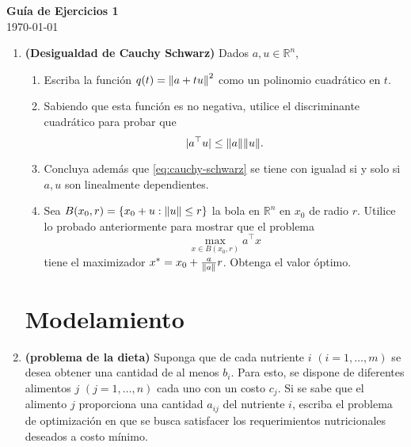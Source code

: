 \documentclass{article}
\begin{document}


\begin{center}
    \Huge{\textbf{Guía de Ejercicios 1}}\\
    \normalsize
    \today
\end{center}

\begin{enumerate}
	\section{Preliminares}
	\item \textbf{(Desigualdad de Cauchy Schwarz)} Dados \(a, u \in \mathbb{R}^n\),
		\begin{enumerate}
			\item Escriba la función \(q(t) = \norm{a + tu}^2\) como un polinomio cuadrático en \(t\).
			\item Sabiendo que esta función es no negativa, utilice el discriminante cuadrático para probar que
				\begin{equation} \label{eq:cauchy-schwarz}
					|a^\top u| \leq \norm{a} \norm{u}.
				\end{equation}
			\item Concluya además que \eqref{eq:cauchy-schwarz} se tiene con igualad si y solo si \(a, u\) son linealmente dependientes.
			\item Sea \(B(x_0, r) = \qty{x_0 + u : \norm{u} \leq r}\) la bola en \(\mathbb{R}^n\) en \(x_0\) de radio \(r\). Utilice lo probado anteriormente para mostrar que el problema
				\[
					\max_{x \in B(x_0, r)} a^\top x
				\]
				tiene el maximizador \(x^* = x_0 + \frac{a}{\norm{a}} r\). Obtenga el valor óptimo.
		\end{enumerate}

\section{Modelamiento}

	\item \textbf{(problema de la dieta)} Suponga que de cada nutriente \(i\) \((i = 1, \dots, m)\) se desea obtener una cantidad de al menos \(b_i\). Para esto, se dispone de diferentes alimentos \(j\) \((j = 1, \dots, n)\) cada uno con un costo \(c_j\). Si se sabe que el alimento \(j\) proporciona una cantidad \(a_{ij}\) del nutriente \(i\), escriba el problema de optimización en que se busca satisfacer los requerimientos nutricionales deseados a costo mínimo.


\end{enumerate}
\end{document}
